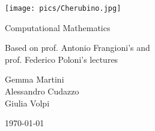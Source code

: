 \documentclass[preview,12pt]{article}
\begin{document}
\begin{titlepage}
\begin{center}
\vspace{3cm}

\Large

\vspace{2cm}

\texttt{[image: pics/Cherubino.jpg]}

\vspace{2.5cm}

{\Huge \sc Computational Mathematics}

\vspace{2cm}
Based on prof. Antonio Frangioni's and\\
  prof. Federico Poloni's lectures

\vspace{2cm}
Gemma Martini\\ Alessandro Cudazzo\\ Giulia Volpi
\vfill

\today

\end{center}
\end{titlepage}


\tableofcontents
\let\tableofcontents\relax

\newpage



\newpage



\newpage



\newpage



\newpage



\newpage




\newpage



\newpage



\newpage



\newpage


\end{document}
